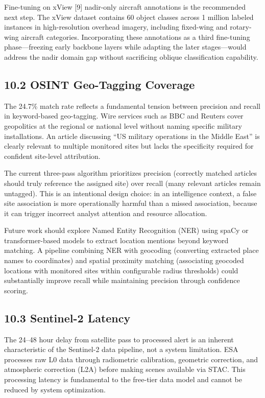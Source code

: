 \documentclass[11pt,a4paper]{article}
\begin{document}
Fine-tuning on xView [9] nadir-only aircraft annotations is the recommended next step. The xView dataset contains 60 object classes across 1 million labeled instances in high-resolution overhead imagery, including fixed-wing and rotary-wing aircraft categories. Incorporating these annotations as a third fine-tuning phase---freezing early backbone layers while adapting the later stages---would address the nadir domain gap without sacrificing oblique classification capability.

\hypertarget{osint-geo-tagging-coverage}{%
\subsection{10.2 OSINT Geo-Tagging Coverage}\label{osint-geo-tagging-coverage}}

The 24.7\% match rate reflects a fundamental tension between precision and recall in keyword-based geo-tagging. Wire services such as BBC and Reuters cover geopolitics at the regional or national level without naming specific military installations. An article discussing ``US military operations in the Middle East'' is clearly relevant to multiple monitored sites but lacks the specificity required for confident site-level attribution.

The current three-pass algorithm prioritizes precision (correctly matched articles should truly reference the assigned site) over recall (many relevant articles remain untagged). This is an intentional design choice: in an intelligence context, a false site association is more operationally harmful than a missed association, because it can trigger incorrect analyst attention and resource allocation.

Future work should explore Named Entity Recognition (NER) using spaCy or transformer-based models to extract location mentions beyond keyword matching. A pipeline combining NER with geocoding (converting extracted place names to coordinates) and spatial proximity matching (associating geocoded locations with monitored sites within configurable radius thresholds) could substantially improve recall while maintaining precision through confidence scoring.

\hypertarget{sentinel-2-latency}{%
\subsection{10.3 Sentinel-2 Latency}\label{sentinel-2-latency}}

The 24--48 hour delay from satellite pass to processed alert is an inherent characteristic of the Sentinel-2 data pipeline, not a system limitation. ESA processes raw L0 data through radiometric calibration, geometric correction, and atmospheric correction (L2A) before making scenes available via STAC. This processing latency is fundamental to the free-tier data model and cannot be reduced by system optimization.
\end{document}
